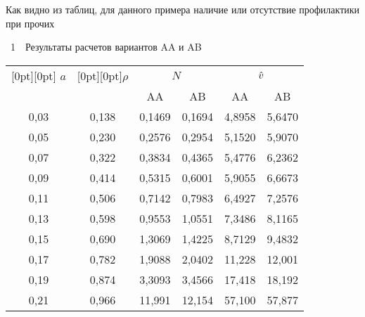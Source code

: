 \begin{multicols}{2}
Как видно из таблиц, для данного примера наличие или
отсутствие профилактики при прочих\linebreak\vspace*{-12pt}

\vspace*{4pt}
\noindent
\begin{center}
\noindent
{\tablename~1}\ \ \small{Результаты расчетов вариантов AA и AB}
\end{center}

\begin{center}
{\small
\tabcolsep=5.5pt
\begin{tabular}{|c|c|r|r|r|r|}
\hline
\raisebox{-6pt}[0pt][0pt]{ $a$} &  \raisebox{-6pt}[0pt][0pt]{$\rho$}
& \multicolumn{2}{c|}{ $N$} &\multicolumn{2}{c|}{ $\hat v$} \\
\cline{3-6}
& & \multicolumn{1}{c|}{AA} & \multicolumn{1}{c|}{AB} & \multicolumn{1}{c|}{AA} & \multicolumn{1}{c|}{AB} \\
\hline
 0,03 & 0,138 & 0,1469 & 0,1694 & 4,8958 & 5,6470 \\
 0,05 & 0,230 & 0,2576 & 0,2954 & 5,1520 & 5,9070 \\
 0,07 & 0,322 & 0,3834 & 0,4365 & 5,4776 & 6,2362 \\
 0,09 & 0,414 & 0,5315 & 0,6001 & 5,9055 & 6,6673 \\
 0,11 & 0,506 & 0,7142 & 0,7983 & 6,4927 & 7,2576 \\
 0,13 & 0,598 & 0,9553 & 1,0551 & 7,3486 & 8,1165 \\
 0,15 & 0,690 & 1,3069 & 1,4225 & 8,7129 & 9,4832 \\
 0,17 & 0,782 & 1,9088 & 2,0402 & 11,228\hphantom{9} & 12,001\hphantom{9} \\
 0,19 & 0,874 & 3,3093 & 3,4566 & 17,418\hphantom{9} & 18,192\hphantom{9} \\
 0,21 & 0,966 & 11,991\hphantom{9} & 12,154\hphantom{9} & 57,100\hphantom{9} & 57,877\hphantom{9} \\
\hline
\end{tabular}
}
\end{center}

\addtocounter{table}{1}


\begin{table*}\small
\begin{center}
\vspace*{2ex}


\end{center}
\end{table*}
\end{multicols}
